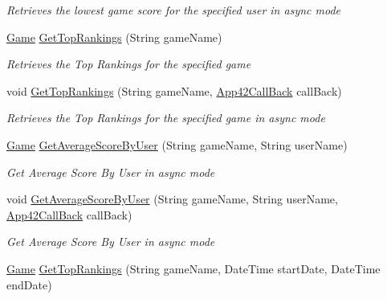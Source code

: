 \begin{DoxyCompactItemize}
\begin{DoxyCompactList}\small\item\em Retrieves the lowest game score for the specified user in async mode \end{DoxyCompactList}\item 
\hyperlink{classcom_1_1shephertz_1_1app42_1_1paas_1_1sdk_1_1csharp_1_1game_1_1_game}{Game} \hyperlink{classcom_1_1shephertz_1_1app42_1_1paas_1_1sdk_1_1csharp_1_1game_1_1_score_board_service_a687e35921c33022391a866a126802474}{Get\+Top\+Rankings} (String game\+Name)
\begin{DoxyCompactList}\small\item\em Retrieves the Top Rankings for the specified game \end{DoxyCompactList}\item 
void \hyperlink{classcom_1_1shephertz_1_1app42_1_1paas_1_1sdk_1_1csharp_1_1game_1_1_score_board_service_a152e6f4cbaa5dca0aea19a055006ea28}{Get\+Top\+Rankings} (String game\+Name, \hyperlink{interfacecom_1_1shephertz_1_1app42_1_1paas_1_1sdk_1_1csharp_1_1_app42_call_back}{App42\+Call\+Back} call\+Back)
\begin{DoxyCompactList}\small\item\em Retrieves the Top Rankings for the specified game in async mode \end{DoxyCompactList}\item 
\hyperlink{classcom_1_1shephertz_1_1app42_1_1paas_1_1sdk_1_1csharp_1_1game_1_1_game}{Game} \hyperlink{classcom_1_1shephertz_1_1app42_1_1paas_1_1sdk_1_1csharp_1_1game_1_1_score_board_service_a280ceb7874be72ad342ed5066cb7f1b8}{Get\+Average\+Score\+By\+User} (String game\+Name, String user\+Name)
\begin{DoxyCompactList}\small\item\em Get Average Score By User in async mode \end{DoxyCompactList}\item 
void \hyperlink{classcom_1_1shephertz_1_1app42_1_1paas_1_1sdk_1_1csharp_1_1game_1_1_score_board_service_a0821aff5af246b3ec4188f859164ca4c}{Get\+Average\+Score\+By\+User} (String game\+Name, String user\+Name, \hyperlink{interfacecom_1_1shephertz_1_1app42_1_1paas_1_1sdk_1_1csharp_1_1_app42_call_back}{App42\+Call\+Back} call\+Back)
\begin{DoxyCompactList}\small\item\em Get Average Score By User in async mode \end{DoxyCompactList}\item 
\hyperlink{classcom_1_1shephertz_1_1app42_1_1paas_1_1sdk_1_1csharp_1_1game_1_1_game}{Game} \hyperlink{classcom_1_1shephertz_1_1app42_1_1paas_1_1sdk_1_1csharp_1_1game_1_1_score_board_service_a19479680be37391daf9484a4890cf9d7}{Get\+Top\+Rankings} (String game\+Name, Date\+Time start\+Date, Date\+Time end\+Date)

\end{DoxyCompactItemize}
